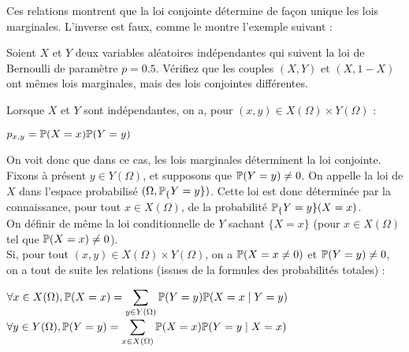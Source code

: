 \documentclass[12pt,a4paper]{report}
\begin{document}
Ces relations montrent que la loi conjointe détermine de façon unique les lois marginales. L'inverse est faux, comme le montre l'exemple suivant :

\begin{exemple}{}
Soient $X$ et $Y$ deux variables aléatoires indépendantes qui suivent la loi de Bernoulli de paramètre $p = 0.5$. Vérifiez que les couples $(X,Y)$ et $(X,1-X)$ ont mêmes lois marginales, mais des lois conjointes différentes.
\end{exemple}

Lorsque $X$ et $Y$ sont indépendantes, on a, pour $(x,y) \in X(\Omega) \times Y(\Omega)$ : 
\begin{center}
$p_{x,y} = \mathbb{P}(X=x)\mathbb{P}(Y=y)$
\end{center}

On voit donc que dans ce cas, les lois marginales déterminent la loi conjointe. \\

Fixons à présent $y \in Y(\Omega)$, et supposons que $\mathbb{P}(Y=y) \ne 0$. On appelle  la loi de $X$ dans l'espace probabilisé $(\Omega, \mathbb{P}_\{Y=y\})$. Cette loi est donc déterminée par la connaissance, pour tout $x \in X(\Omega)$, de la probabilité $\mathbb{P}_\{Y = y\}(X=x)$. \\

On définir de même la loi conditionnelle de $Y$ sachant $\{X=x\}$ (pour $x \in X(\Omega)$ tel que $\mathbb{P}(X=x) \ne 0$). \\

Si, pour tout $(x,y) \in X(\Omega) \times Y(\Omega)$, on a $\mathbb{P}(X=x \ne 0)$ et $\mathbb{P}(Y=y) \ne 0$, on a tout de suite les relations (issues de la formules des probabilités totales) : 
\begin{center}
$\forall x \in X(\Omega), \mathbb{P}(X=x) = \displaystyle \sum_{y \in Y(\Omega)} \mathbb{P}(Y=y)\mathbb{P}(X=x \mid Y=y)$ \\
$\forall y \in Y(\Omega), \mathbb{P}(Y=y) = \displaystyle \sum_{x \in X(\Omega)} \mathbb{P}(X=x)\mathbb{P}(Y=y \mid X=x)$
\end{center}
	
\end{document}

